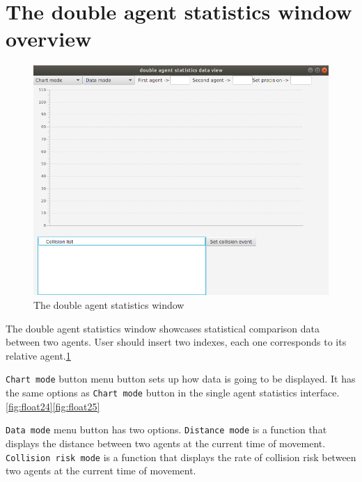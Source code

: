 \documentclass[thesis=B,english]{FITthesis}[2019/12/23]
\begin{document}
\section{The double agent statistics window overview}




\begin{figure}
	\includegraphics[scale=0.34]{DoubleAgentStatistics.png}
	\caption[Double Agent Statistics]{The double agent statistics window}\label{fig:float23}
\end{figure}

The double agent statistics window showcases statistical comparison data between two agents. User should insert two indexes, each one corresponds to its relative agent.\ref{fig:float23}

\verb|Chart mode| button menu button sets up how data is going to be displayed. It has the same options as \verb|Chart mode| button in the single agent statistics interface.\ref{fig:float24}\ref{fig:float25}

\verb|Data mode| menu button has two options. \verb|Distance mode| is a function that displays the distance between two agents at the current time of movement. \verb|Collision risk mode| is a function that displays the rate of collision risk between two agents at the current time of movement.
\end{document}
